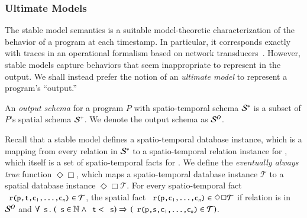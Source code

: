 
\subsubsection{Ultimate Models}
The stable model semantics is a suitable model-theoretic characterization of the behavior of a program at each timestamp.  In particular, it corresponds exactly with traces in an operational formalism based on network transducers~\cite{ameloot-operational}.  However, stable models capture behaviors that seem inappropriate to represent in the output.  We shall instead prefer the notion of an {\em ultimate model} to represent a program's ``output.''



An {\em output schema} for a \lang program $P$ with spatio-temporal schema
$\stschema$ is a subset of $P$'s spatial schema $\sschema$.  We denote the output schema as
$\oschema$.

Recall that a stable model defines a spatio-temporal database instance, which is a mapping from every relation  in $\stschema$ to a spatio-temporal relation instance for , which itself is a set of spatio-temporal facts for .  We define the {\em eventually always true} function $\Diamond\Box$, which maps a spatio-temporal database instance $\mathcal{T}$ to a spatial database instance $\Diamond\Box\mathcal{T}$.  For every spatio-temporal fact $\dedalus{r(p,t,c\sub{1},\ldots,c\sub{n})} \in \mathcal{T}$, the spatial fact $\dedalus{r(p,c\sub{1},\ldots,c\sub{n})} \in \Diamond\Box\mathcal{T}$ if relation  is in $\oschema$ and $\forall \dedalus{s}\, . \, \left(\dedalus{s} \in \mathbb{N} \land \dedalus{t} < \dedalus{s}\right) \Rightarrow$ \linebreak $\left(\dedalus{r(p,s,c\sub{1},\ldots,c\sub{n})} \in \mathcal{T}\right)$.

